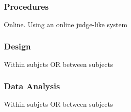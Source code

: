 







\subsubsection{Procedures}


Online. Using an online judge-like system


\subsubsection{Design}


Within subjcts OR between subjects



\subsubsection{Data Analysis}


Within subjcts OR between subjects










